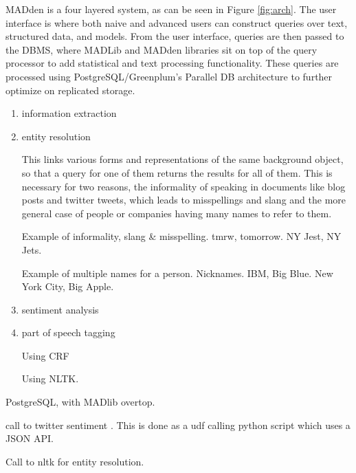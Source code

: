 \documentclass{article}
\newcommand{\system}{MADden\xspace}
\begin{document}
\begin{enumerate}
\begin{enumerate}
\begin{enumerate}
      {\system} is a four layered system, as can be seen in Figure \ref{fig:arch}.
      The user interface is where both naive and advanced users can construct queries over text, structured data, and models.
      From the user interface,
      queries are then passed to the DBMS,
      where MADLib and {\system} libraries sit on top of the query processor to add statistical and text processing functionality.
      These queries are processed using PostgreSQL/Greenplum's Parallel DB architecture to further optimize on replicated storage.

      \begin{enumerate}
      \item information extraction

        
      \item entity resolution

        This links various forms and representations of the same background object, 
        so that a query for one of them returns the results for all of them.
        This is necessary for two reasons,
        the informality of speaking in documents like blog posts and twitter tweets, 
        which leads to misspellings and slang
        and the more general case of people or companies having many names to refer to them.
        
        Example of informality, slang \& misspelling. tmrw, tomorrow. NY Jest, NY Jets.

        Example of multiple names for a person. Nicknames. IBM, Big Blue. New York City, Big Apple.

      \item sentiment analysis


      \item part of speech tagging

        Using CRF

        Using NLTK.
      \end{enumerate}


      PostgreSQL, with MADlib overtop.

      call to twitter sentiment . This is done as a udf calling python script which uses a JSON API.

      Call to nltk for entity resolution.


\end{enumerate}
\end{enumerate}
\end{enumerate}
\end{document}
